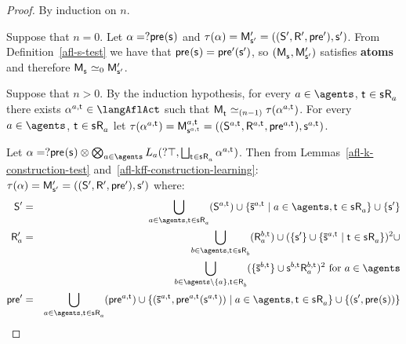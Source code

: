 \begin{proof}
By induction on $n$.

Suppose that $n = 0$. 
Let $\alpha = \test{\aPrecondition(\aStateS)}$ and $\tau(\alpha) = \aPModelP{\aStateSP} = \aPModelTupleP{\aStateSP}$. 
From Definition~\ref{afl-s-test} we have that $\aPrecondition(\aStateS) = \aPreconditionP(\aStateSP)$, so $(\aPModel{\aStateS}, \aPModelP{\aStateSP})$ satisfies {\bf atoms} and therefore $\aPModel{\aStateS} \bisimilar[0] \aPModelP{\aStateSP}$.

Suppose that $n > 0$. 
By the induction hypothesis, for every $\agentA \in \agents$, $\aStateT \in \aStateS \aAccessibility{\agentA}$ there exists $\alpha^{\agentA,\aStateT} \in \langAflAct$ such that 
$\aPModel{\aStateT} \bisimilar[(n - 1)] \tau(\alpha^{\agentA,\aStateT})$. 
For every $\agentA \in \agents$, $\aStateT \in \aStateS \aAccessibility{\agentA}$ let $\tau(\alpha^{\agentA,\aStateT}) = \aPModel[\agentA,\aStateT]{\aStateS[\agentA,\aStateT]} = \aPModelTuple[\agentA,\aStateT]{\aStateS[\agentA,\aStateT]}$.

Let $\alpha = \test{\aPrecondition(\aStateS)} \compose \bigcompose_{\agentA \in \agents} \learns_\agentA (\test{\top}, \bigchoice_{\aStateT \in \aStateS \aAccessibility{\agentA}} \alpha^{\agentA,\aStateT})$.
Then from Lemmas~\ref{afl-k-construction-test} and~\ref{afl-kff-construction-learning}: $\tau(\alpha) = \aPModelP{\aStateSP} =\aPModelTupleP{\aStateSP}$ where:
\begin{eqnarray*}
    \aStatesP &=& \bigcup_{\agentA \in \agents, \aStateT \in \aStateS \aAccessibility{\agentA}} (\aStates[\agentA,\aStateT]) \cup \{\aPStateS[\agentA,\aStateT] \mid \agentA \in \agents, \aStateT \in \aStateS \aAccessibility{\agentA}\} \cup \{\aStateSP\}\\
    \aAccessibilityP{\agentA} &=& \bigcup_{\agentB \in \agents, \aStateT \in \aStateS \aAccessibility{\agentB}} (\aAccessibility[\agentB,\aStateT]{\agentA}) \cup (\{\aStateSP\} \cup \{\aPStateS[\agentA,\aStateT] \mid \aStateT \in \aStateS \aAccessibility{\agentA}\})^2 \cup\\&&\quad\bigcup_{\agentB \in \agents \setminus \{\agentA\}, \aStateT \in \aAccessibility{\agentB}} (\{\aPStateS[\agentB,\aStateT]\} \cup \aStateS[\agentB,\aStateT] \aAccessibility[\agentB,\aStateT]{\agentA})^2 \text{ for } \agentA \in \agents\\
    \aPreconditionP &=& \bigcup_{\agentA \in \agents, \aStateT \in \aStateS \aAccessibility{\agentA}} (\aPrecondition[\agentA,\aStateT]) \cup \{(\aPStateS[\agentA,\aStateT], \aPrecondition[\agentA,\aStateT](\aStateS[\agentA,\aStateT])) \mid \agentA \in \agents, \aStateT \in \aStateS \aAccessibility{\agentA}\} \cup \{(\aStateSP, \aPrecondition(\aStateS))\}
\end{eqnarray*}


\end{proof}
